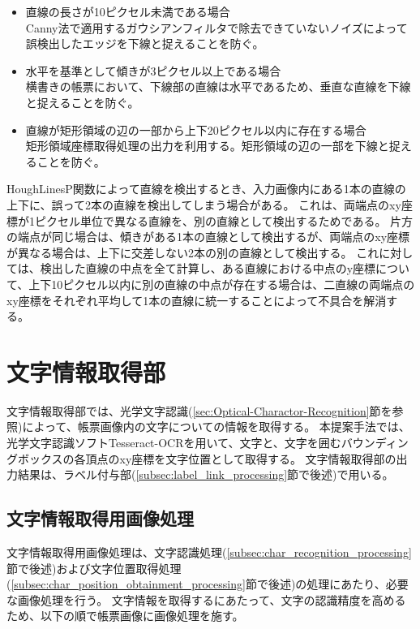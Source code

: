 \begin{itemize}
    \item 直線の長さが10ピクセル未満である場合\\
        Canny法で適用するガウシアンフィルタで除去できていないノイズによって誤検出したエッジを下線と捉えることを防ぐ。
    \item 水平を基準として傾きが3ピクセル以上である場合\\
        横書きの帳票において、下線部の直線は水平であるため、垂直な直線を下線と捉えることを防ぐ。
    \item 直線が矩形領域の辺の一部から上下20ピクセル以内に存在する場合\\
        矩形領域座標取得処理の出力を利用する。矩形領域の辺の一部を下線と捉えることを防ぐ。
\end{itemize}

HoughLinesP関数によって直線を検出するとき、入力画像内にある1本の直線の上下に、誤って2本の直線を検出してしまう場合がある。
これは、両端点のxy座標が1ピクセル単位で異なる直線を、別の直線として検出するためである。
片方の端点が同じ場合は、傾きがある1本の直線として検出するが、両端点のxy座標が異なる場合は、上下に交差しない2本の別の直線として検出する。
これに対しては、検出した直線の中点を全て計算し、ある直線における中点のy座標について、上下10ピクセル以内に別の直線の中点が存在する場合は、二直線の両端点のxy座標をそれぞれ平均して1本の直線に統一することによって不具合を解消する。

\section{文字情報取得部}\label{sec:OCR_part}
文字情報取得部では、光学文字認識(\ref{sec:Optical-Charactor-Recognition}節を参照)によって、帳票画像内の文字についての情報を取得する。
本提案手法では、光学文字認識ソフトTesseract-OCRを用いて、文字と、文字を囲むバウンディングボックスの各頂点のxy座標を文字位置として取得する。
文字情報取得部の出力結果は、ラベル付与部(\ref{subsec:label_link_processing}節で後述)で用いる。

\subsection{文字情報取得用画像処理}\label{subsec:image_processing_for_char_recognition}
文字情報取得用画像処理は、文字認識処理(\ref{subsec:char_recognition_processing}節で後述)および文字位置取得処理(\ref{subsec:char_position_obtainment_processing}節で後述)の処理にあたり、必要な画像処理を行う。
文字情報を取得するにあたって、文字の認識精度を高めるため、以下の順で帳票画像に画像処理を施す。

